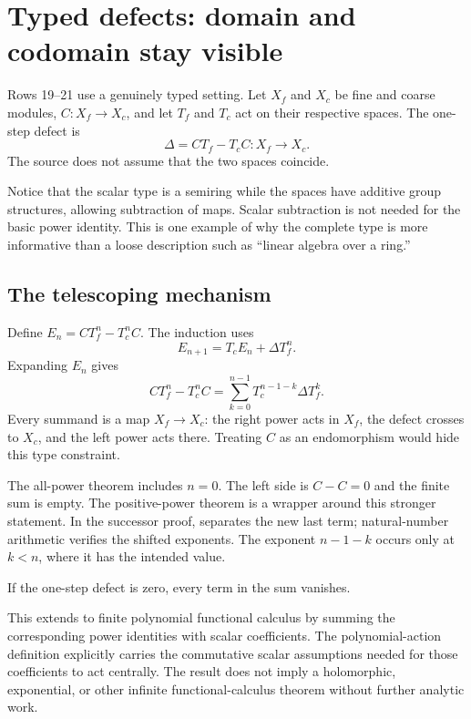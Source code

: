 \section{Typed defects: domain and codomain stay visible}\label{sec:defects}

Rows 19--21 use a genuinely typed setting. Let $X_f$ and $X_c$ be fine and coarse modules, $C:X_f\to X_c$, and let $T_f$ and $T_c$ act on their respective spaces. The one-step defect is
\[
\Delta=CT_f-T_cC:X_f\longrightarrow X_c.
\]
The source does not assume that the two spaces coincide.

Notice that the scalar type is a semiring while the spaces have additive group structures, allowing subtraction of maps. Scalar subtraction is not needed for the basic power identity. This is one example of why the complete type is more informative than a loose description such as ``linear algebra over a ring.''

\subsection{The telescoping mechanism}

Define $E_n=CT_f^n-T_c^nC$. The induction uses
\[
E_{n+1}=T_cE_n+\Delta T_f^n.
\]
Expanding $E_n$ gives
\[
CT_f^n-T_c^nC
=\sum_{k=0}^{n-1}T_c^{n-1-k}\Delta T_f^k.
\]
Every summand is a map $X_f\to X_c$: the right power acts in $X_f$, the defect crosses to $X_c$, and the left power acts there. Treating $C$ as an endomorphism would hide this type constraint.

The all-power theorem includes $n=0$. The left side is $C-C=0$ and the finite sum is empty. The positive-power theorem is a wrapper around this stronger statement. In the successor proof,  separates the new last term; natural-number arithmetic verifies the shifted exponents. The exponent $n-1-k$ occurs only at $k<n$, where it has the intended value.

If the one-step defect is zero, every term in the sum vanishes.

This extends to finite polynomial functional calculus by summing the corresponding power identities with scalar coefficients. The polynomial-action definition explicitly carries the commutative scalar assumptions needed for those coefficients to act centrally. The result does not imply a holomorphic, exponential, or other infinite functional-calculus theorem without further analytic work.

